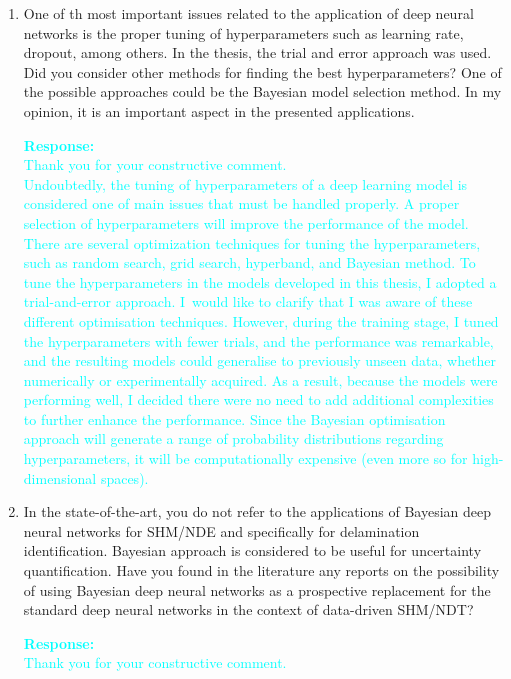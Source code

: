 \documentclass[11pt,a2paper]{report}
\begin{document}
\begin{enumerate}
		\item One of th most important issues related to the application of deep neural networks is the proper tuning of hyperparameters such as learning rate, dropout, among others. In the thesis, the trial and error approach was used. Did you consider other methods for finding the best hyperparameters? One of the possible approaches could be the Bayesian model selection method. In my opinion, it is an important aspect in the presented applications.
		
		\textcolor{Cyan}{
			\textbf{Response:}\\
			Thank you for your constructive comment. \\
			Undoubtedly, the tuning of hyperparameters of a deep learning model is considered one of main issues that must be handled properly.
			A proper selection of hyperparameters will improve the performance of the model. 
			There are several optimization techniques for tuning the hyperparameters, such as random search, grid search, hyperband, and Bayesian method.
			To tune the hyperparameters in the models developed in this thesis, I adopted a trial-and-error approach.
			I would like to clarify that I was aware of these different optimisation techniques.
			However, during the training stage, I tuned the hyperparameters with fewer trials, and the performance was remarkable, and the resulting models could generalise to previously unseen data, whether numerically or experimentally acquired.
			As a result, because the models were performing well, I decided there were no need to add additional complexities to further enhance the performance.
			Since the Bayesian optimisation approach will generate a range of probability distributions regarding hyperparameters, it will be computationally expensive (even more so for high-dimensional spaces). 
			}	
		
		\item In the state-of-the-art, you do not refer to the applications of Bayesian deep neural networks for SHM/NDE and specifically for delamination identification. Bayesian approach is considered to be useful for uncertainty quantification. Have you found in the literature any reports on the possibility of using Bayesian deep neural networks as a prospective replacement for the standard deep neural networks in the context of data-driven SHM/NDT?
		
		\textcolor{Cyan}{
			\textbf{Response:} \\
			Thank you for your constructive comment. \\
			}
	\end{enumerate}
\end{document}
